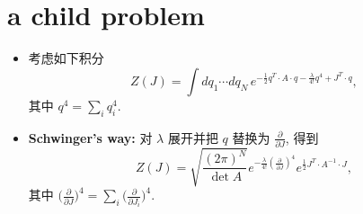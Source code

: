 \section{a child problem}
\begin{itemize}
	\item 考虑如下积分
	\begin{equation}
		Z(J) = \int dq_1 \cdots dq_N \, e^{- \frac{1}{2} q^T \cdot A \cdot q - \frac{\lambda}{4!} q^4 + J^T \cdot q},
	\end{equation}
	其中 $q^4 = \sum_i q_i^4$.
	
	\item \textbf{Schwinger's way:} 对 $\lambda$ 展开并把 $q$ 替换为 $\frac{\partial}{\partial J}$, 得到
	\begin{equation}
		Z(J) = \sqrt{\frac{(2 \pi)^N}{\det A}} e^{- \frac{\lambda}{4!} (\frac{\partial}{\partial J})^4} e^{\frac{1}{2} J^T \cdot A^{- 1} \cdot J},
	\end{equation}
	其中 $\big( \frac{\partial}{\partial J} \big)^4 = \sum_i \big( \frac{\partial}{\partial J_i} \big)^4$.
\end{itemize}


